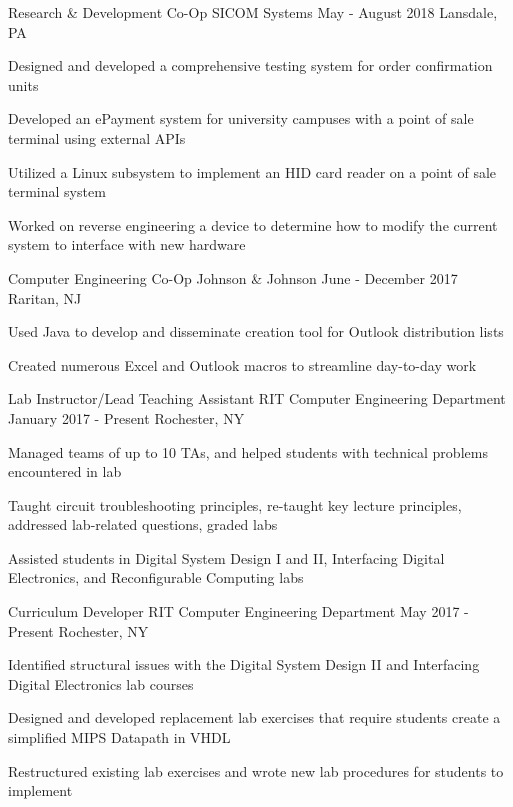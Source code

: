 
\begin{cvexperiences}

	\cvexperience
		{Research \& Development Co-Op}
		{SICOM Systems}
		{May - August 2018}
		{Lansdale, PA}
		{
			\begin{cvitems}
			\item {Designed and developed a comprehensive testing system for order confirmation units}
			\item {Developed an ePayment system for university campuses with a point of sale terminal using external APIs}
			\item {Utilized a Linux subsystem to implement an HID card reader on a point of sale terminal system}
			\item {Worked on reverse engineering a device to determine how to modify the current system to interface with new hardware}
			\end{cvitems}
		}

	\cvexperience
		{Computer Engineering Co-Op}
		{Johnson \& Johnson}
		{June - December 2017}
		{Raritan, NJ}
		{
			\begin{cvitems}
			\item {Used Java to develop and disseminate creation tool for Outlook distribution lists}
			\item {Created numerous Excel and Outlook macros to streamline day-to-day work}
			\end{cvitems}
		}

	\cvexperience
		{Lab Instructor/Lead Teaching Assistant}
		{RIT Computer Engineering Department}
		{January 2017 - Present}
		{Rochester, NY}
		{
			\begin{cvitems}
			\item{Managed teams of up to 10 TAs, and helped students with technical problems encountered in lab}
			\item{Taught circuit troubleshooting principles, re-taught key lecture principles, addressed lab-related questions, graded labs}
			\item{Assisted students in Digital System Design I and II, Interfacing Digital Electronics, and Reconfigurable Computing labs}
			\end{cvitems}
		}

	\cvexperience
		{Curriculum Developer}
		{RIT Computer Engineering Department}
		{May 2017 - Present}
		{Rochester, NY}
		{
			\begin{cvitems}
			\item {Identified structural issues with the Digital System Design II and Interfacing Digital Electronics lab courses}
			\item {Designed and developed replacement lab exercises that require students create a simplified MIPS Datapath in VHDL}
			\item {Restructured existing lab exercises and wrote new lab procedures for students to implement}
			\end{cvitems}
		}


\end{cvexperiences}
